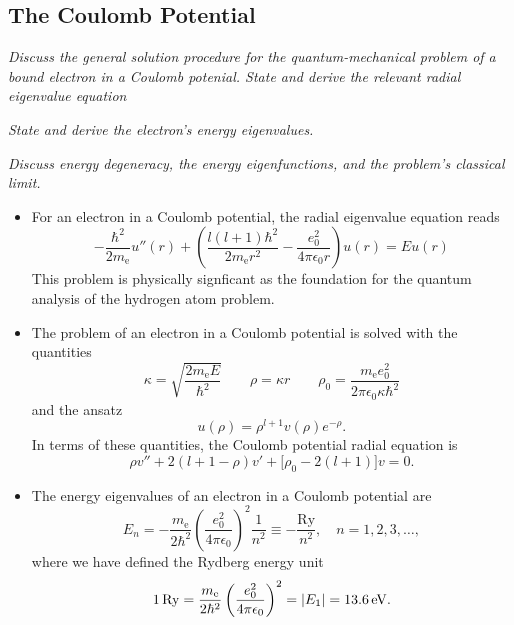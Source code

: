 \documentclass[11pt, a4paper]{article}
\begin{document}
\subsection{The Coulomb Potential}
\textit{Discuss the general solution procedure for the quantum-mechanical problem of a bound electron in a Coulomb potenial. State and derive the relevant radial eigenvalue equation}

\vspace{2mm}
\textit{State and derive the electron's energy eigenvalues.}

\vspace{2mm}
\textit{Discuss energy degeneracy, the energy eigenfunctions, and the problem's classical limit.}

\begin{itemize}
    \item For an electron in a Coulomb potential, the radial eigenvalue equation reads
	\begin{equation*}
		-\frac{\hbar^{2}}{2m_{\text{e}}}u''(r) + \left(\frac{l (l+1)\hbar^{2}}{2m_{\text{e}}r^{2}} - \frac{e_{0}^{2}}{4\pi \epsilon_{0}r}\right)u(r) = Eu(r)
	\end{equation*}
    This problem is physically signficant as the foundation for the quantum analysis of the hydrogen atom problem.

    \item The problem of an electron in a Coulomb potential is solved with the quantities
    \begin{equation*}
        \kappa = \sqrt{\frac{2m_{\text{e}}E}{\hbar^{2}}} \qquad \rho = \kappa r \qquad \rho_{0} = \frac{m_{\text{e}}e_{0}^{2}}{2\pi \epsilon_{0} \kappa \hbar^{2}}
    \end{equation*}
    and the ansatz
    \begin{equation*}
        u(\rho) = \rho^{l + 1}v(\rho)e^{-\rho}.
    \end{equation*}
    In terms of these quantities, the Coulomb potential radial equation is
    \begin{equation*}
        \rho v'' + 2(l + 1 - \rho)v' + \big[ \rho_{0} - 2(l + 1) \big]v = 0.
    \end{equation*}
    
    
	\item The energy eigenvalues of an electron in a Coulomb potential are
	\begin{equation*}
		E_{n} = - \frac{m_{\text{e}}}{2\hbar^{2}}\left(\frac{e_{0}^{2}}{4\pi \epsilon_{0}}\right)^{2}\frac{1}{n^{2}} \equiv - \frac{\text{Ry}}{n^{2}}, \quad n = 1, 2, 3, \ldots,
	\end{equation*}
	where we have defined the Rydberg energy unit
	\begin{equation*}
		\SI{1}{Ry} = \frac{m_{\text{e}}}{2\hbar^{2}}\left(\frac{e_{0}^{2}}{4\pi \epsilon_{0}}\right)^{2} = \abs{E_{1}} = \SI{13.6}{\electronvolt}.
	\end{equation*}
    

\end{itemize}
\end{document}
